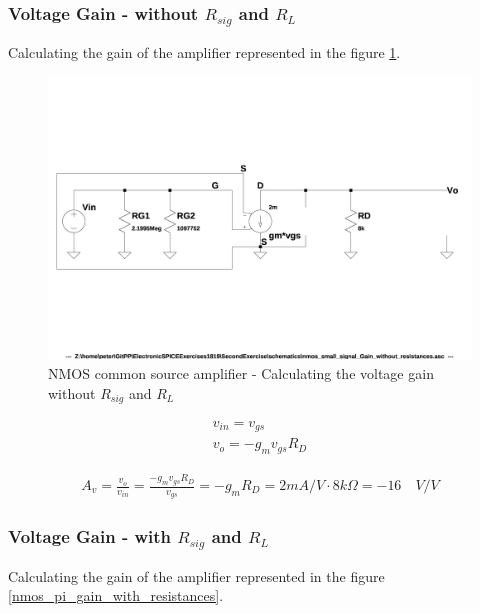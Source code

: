 \documentclass[10pt,a4paper]{book}
\begin{document}
\subsubsection{Voltage Gain - without $R_{sig}$ and $R_L$}
Calculating the gain of the amplifier represented in the figure \ref{nmos_pi_gain_without_resistances}.

\begin{figure}[h]
  \centering
  \includegraphics[width=12cm]{schematics/nmos_small_signal_without_resistances.jpg}
  \caption{NMOS common source amplifier - Calculating the voltage gain without $R_{sig}$ and $R_L$}
  \label{nmos_pi_gain_without_resistances}
\end{figure}

\begin{align}
v_{in} = v_{gs}\\
v_{o} = - g_m v_{gs} R_D
\end{align}

\begin{align}
A_v = \frac{v_o}{v_{in}} = \frac{- g_m v_{gs} R_D}{v_{gs}} = - g_m R_D = 2mA/V \cdot 8k\Omega = -16 \quad V/V
\end{align}

\subsubsection{Voltage Gain - with $R_{sig}$ and $R_L$}
Calculating the gain of the amplifier represented in the figure \ref{nmos_pi_gain_with_resistances}.
\end{document}

